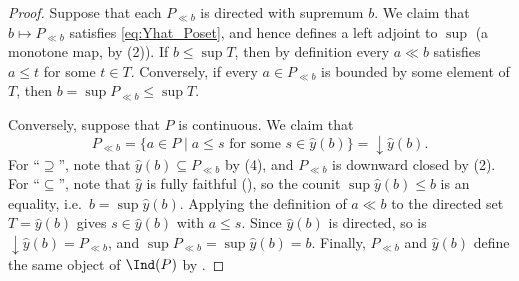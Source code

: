 
	\begin{proof}
		Suppose that each $P_{\ll b}$ is directed with supremum $b$. We claim that $b \mapsto P_{\ll b}$ satisfies \eqref{eq:Yhat_Poset}, and hence defines a left adjoint to $\sup$ (a monotone map, by (2)). If $b \leq \sup T$, then by definition every $a \ll b$ satisfies $a \leq t$ for some $t \in T$. Conversely, if every $a \in P_{\ll b}$ is bounded by some element of $T$, then $b = \sup P_{\ll b} \leq \sup T$.

		Conversely, suppose that $P$ is continuous. We claim that
		\[
			P_{\ll b} = \{a \in P \mid a \leq s \text{ for some } s \in \hat{y}(b)\} = {\downarrow}\hat{y}(b).
		\]
		For ``$\supseteq$'', note that $\hat{y}(b) \subseteq P_{\ll b}$ by (4), and $P_{\ll b}$ is downward closed by (2). For ``$\subseteq$'', note that $\hat{y}$ is fully faithful (), so the counit $\sup\hat{y}(b) \leq b$ is an equality, i.e.\ $b = \sup \hat{y}(b)$. Applying the definition of $a \ll b$ to the directed set $T = \hat{y}(b)$ gives $s \in \hat{y}(b)$ with $a \leq s$. Since $\hat{y}(b)$ is directed, so is ${\downarrow}\hat{y}(b) = P_{\ll b}$, and $\sup P_{\ll b} = \sup \hat{y}(b) = b$. Finally, $P_{\ll b}$ and $\hat{y}(b)$ define the same object of $\Ind(P)$ by .
	\end{proof}

